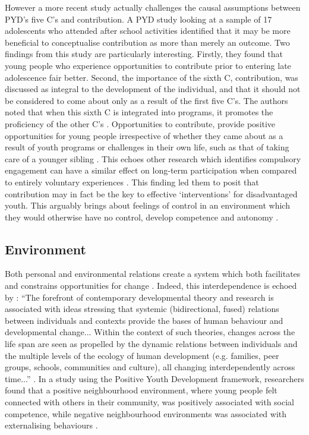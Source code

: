 However a more recent study actually challenges the causal assumptions between PYD's five C's and contribution. A PYD study looking at a sample of 17 adolescents who attended after school activities identified that it may be more beneficial to conceptualise contribution as more than merely an outcome. Two findings from this study are particularly interesting. Firstly, they found that young people who experience opportunities to contribute prior to entering late adolescence fair better. Second, the importance of the sixth C, contribution, was discussed as integral to the development of the individual, and that it should not be considered to come about only as a result of the first five C's. The authors noted that when this sixth C is integrated into programs, it promotes the proficiency of the other C's \citep{ForrestBank2015}. Opportunities to contribute, provide positive opportunities for young people irrespective of whether they came about as a result of youth programs or challenges in their own life, such as that of taking care of a younger sibling \citep{ForrestBank2015}. This echoes other research which identifies compulsory engagement can have a similar effect on long-term participation when compared to entirely voluntary experiences \citep[see][in section \ref{Mandatory}]{Brown2007,Stukas1999,Henderson2007,Pearce2006}. This finding led them to posit that contribution may in fact be the key to effective `interventions' for disadvantaged youth. This arguably brings about feelings of control in an environment which they would otherwise have no control, develop competence and autonomy \citep{ForrestBank2015}.



\subsection{Environment}

Both personal and environmental relations create a system which both facilitates and constrains opportunities for change \citep{Lerner2010}. Indeed, this interdependence is echoed by  \citet[][p173]{Lerner2010}: “The forefront of contemporary developmental theory and research is associated with ideas stressing that systemic (bidirectional, fused) relations between individuals and contexts provide the bases of human behaviour and developmental change... Within the context of such theories, changes across the life span are seen as propelled by the dynamic relations between individuals and the multiple levels of the ecology of human development (e.g. families, peer groups, schools, communities and culture), all changing interdependently across time...” \citep[][p173]{Lerner2010}. In a study using the Positive Youth Development framework, researchers found that a positive neighbourhood environment, where young people felt connected with others in their community, was positively associated with social competence, while negative neighbourhood environments was associated with externalising behaviours \citep{Youngblade2007}.


